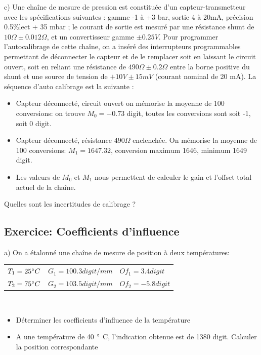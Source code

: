 c)	Une chaîne de mesure de pression est constituée d'un capteur-transmetteur avec les spécifications suivantes : gamme -1 à +3 bar, sortie 4 à 20mA, précision 0.5\%lect + 35 mbar ; le courant de sortie est mesuré par une résistance shunt de $10 \Omega \pm 0.012 \Omega$, et un convertisseur gamme $\pm 0.25V$.
Pour programmer l'autocalibrage de cette chaîne, on a inséré des interrupteurs programmables permettant de déconnecter le capteur et de le remplacer soit en laissant le circuit ouvert, soit en reliant une résistance de $490 \Omega \pm 0.2 \Omega$ entre la borne positive du shunt et une source de tension de $+10V \pm 15mV$ (courant nominal de 20 mA). La séquence d'auto calibrage est la suivante :
\begin{itemize}
\item Capteur déconnecté, circuit ouvert on mémorise la moyenne de 100 conversions: on trouve $M_0=-0.73$ digit, toutes les conversions sont soit -1, soit 0 digit.
\item Capteur déconnecté, résistance $490 \Omega$ enclenchée. On mémorise la moyenne de 100 conversions: $M_1=1647.32$, conversion maximum 1646, minimum 1649 digit.
\item Les valeurs de $M_0$ et $M_1$ nous permettent de calculer le gain et l'offset total actuel de la chaîne.
\end{itemize}

Quelles sont les incertitudes de calibrage ?

\subsection{Exercice: Coefficients d'influence}

a)	On a étalonné une chaîne de mesure de position à deux températures:


\begin {center}
\begin{tabular}{lll}
$T_1=25 \degree C$ &	$G_1= 100.3 digit/mm$ &	$Of_1 = 3.4 digit$ \\
$T_2=75 \degree C$ &	$G_2 = 103.5 digit/mm$ &	$Of_2 = -5.8 digit$ \\
\end{tabular}
\end{center}
~\\
\begin{itemize}
\item Déterminer les coefficients d'influence de la température
\item A une température de 40 $\degree$ C, l'indication obtenue est de 1380 digit. Calculer la position correspondante
\end{itemize}
~\\


